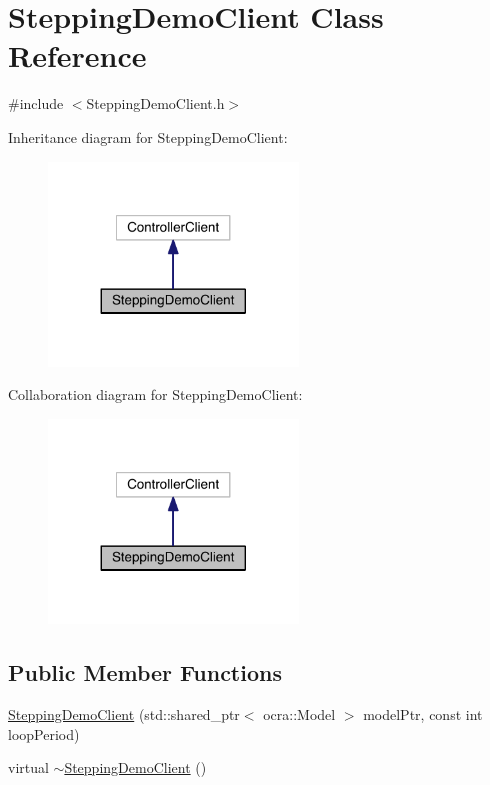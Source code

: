 \hypertarget{classSteppingDemoClient}{}\section{Stepping\+Demo\+Client Class Reference}
\label{classSteppingDemoClient}


{\ttfamily \#include $<$Stepping\+Demo\+Client.\+h$>$}



Inheritance diagram for Stepping\+Demo\+Client\+:\nopagebreak
\begin{figure}[H]
\begin{center}
\leavevmode
\includegraphics[width=188pt]{classSteppingDemoClient__inherit__graph}
\end{center}
\end{figure}


Collaboration diagram for Stepping\+Demo\+Client\+:\nopagebreak
\begin{figure}[H]
\begin{center}
\leavevmode
\includegraphics[width=188pt]{classSteppingDemoClient__coll__graph}
\end{center}
\end{figure}
\subsection*{Public Member Functions}
\begin{DoxyCompactItemize}
\item 
\hyperlink{classSteppingDemoClient_a28e41547ba5641741ceb3b378a5983db}{Stepping\+Demo\+Client} (std\+::shared\+\_\+ptr$<$ ocra\+::\+Model $>$ model\+Ptr, const int loop\+Period)
\item 
virtual \hyperlink{classSteppingDemoClient_a573eed904c7262c5cdbaf6e254d72559}{$\sim$\+Stepping\+Demo\+Client} ()
\end{DoxyCompactItemize}

